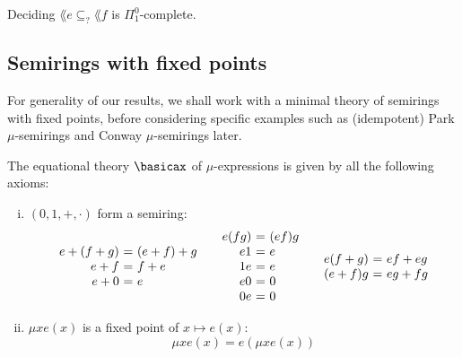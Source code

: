 \begin{proposition}
    Deciding $\lang e \subseteq_? \lang f$ is $\Pi^0_1$-complete.
\end{proposition}

\subsection{Semirings with fixed points}
For generality of our results, we shall work with a minimal theory of semirings with fixed points, before considering specific examples such as (idempotent) Park $\mu$-semirings and Conway $\mu$-semirings later.

\begin{definition}
    The equational theory $\basicax$ of $\mu$-expressions is given by all the following axioms:
    \begin{enumerate}[(i)]
    \item $(0,1,+,\cdot) $ form a semiring:
    \[
    \begin{array}{r@{\ = \ }l}
         e + (f+g) & (e+f)+g \\
         e+f & f + e\\
         e+0 & e 
    \end{array}
    \quad
    \begin{array}{r@{\ = \ }l}
         e (fg) & (ef)g \\
         e1 & e \\
         1 e & e \\
         e0 & 0 \\
         0e & 0
    \end{array}
    \quad
    \begin{array}{r@{\ = \ }l}
         e(f+g) & ef + eg \\
         (e+f)g & eg + fg
    \end{array}
    \]
    \item\label{item:fixed-point-axioms} $\mu x e(x)$ is a fixed point of $ x \mapsto e(x)$:
    \[
    \mu x e(x) = e (\mu x e(x))
    \]
    \end{enumerate}
\end{definition}

